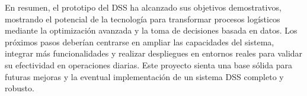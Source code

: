 \documentclass[9pt,a4paper]{rho}
\begin{document}
En resumen, el prototipo del DSS ha alcanzado sus objetivos demostrativos, mostrando el potencial de la tecnología para transformar procesos logísticos mediante la optimización avanzada y la toma de decisiones basada en datos. Los próximos pasos deberían centrarse en ampliar las capacidades del sistema, integrar más funcionalidades y realizar despliegues en entornos reales para validar su efectividad en operaciones diarias. Este proyecto sienta una base sólida para futuras mejoras y la eventual implementación de un sistema DSS completo y robusto.



\printbibliography[title={Referencias}]

\end{document}
